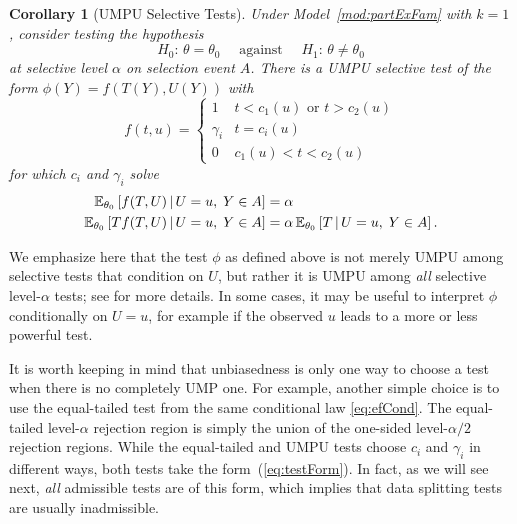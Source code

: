 \documentclass{article}
\newtheorem{corollary}[theorem]{Corollary}
\theoremstyle{definition}
\begin{document}
\begin{corollary}[UMPU Selective Tests]\label{cor:selUmpu}
   Under Model~\ref{mod:partExFam} with $k=1$, consider testing the hypothesis
   \begin{equation}\label{eq:uniNullSel}
     H_0:\,\theta = \theta_0 \quad \text{ against }
     \quad H_1:\,\theta     \neq \theta_0
   \end{equation}
   at selective level $\alpha$ on selection event $A$.
   There is a UMPU selective test of the form $\phi(Y) = f(T(Y),U(Y))$ with
   \begin{equation}
     f(t,u) = \left\{\begin{matrix}
         1 & t < c_1(u) \text{ or } t > c_2(u)\\
         \gamma_i & t = c_i(u)\\
         0 & c_1(u) < t < c_2(u)
       \end{matrix}\right.
   \end{equation}
   for which $c_i$ and $\gamma_i$ solve
   \begin{align}\label{eq:selSolveLev}
     \mathbb{E}_{\theta_0}\left[f(T, U)\,|\,  U=u,\; Y\in A\right] &= \alpha \\
     \label{eq:selSolveUnbi}
     \mathbb{E}_{\theta_0}\left[Tf(T, U)\,|\, U=u,\; Y\in A \right]
     &=  \alpha\,\mathbb{E}_{\theta_0}\left[T\,|\, U=u,\; Y\in A\right].
   \end{align}
\end{corollary}

We emphasize here that the test $\phi$ as defined above is not merely UMPU among selective tests that condition on $U$, but rather it is UMPU among {\em all} selective level-$\alpha$ tests; see \citet{lehmann2005testing} for more details. In some cases, it may be useful to interpret $\phi$ conditionally on $U=u$, for example if the observed $u$ leads to a more or less powerful test.

It is worth keeping in mind that unbiasedness is only one way to choose a test when there is no completely UMP one. For example, another simple choice is to use the equal-tailed test from the same conditional law \eqref{eq:efCond}. The equal-tailed level-$\alpha$ rejection region is simply the union of the one-sided level-$\alpha/2$ rejection regions. While the equal-tailed and UMPU tests choose $c_i$ and $\gamma_i$ in different ways, both tests take the form~(\ref{eq:testForm}). In fact, as we will see next, {\em all} admissible tests are of this form, which implies that data splitting tests are usually inadmissible.
\end{document}
